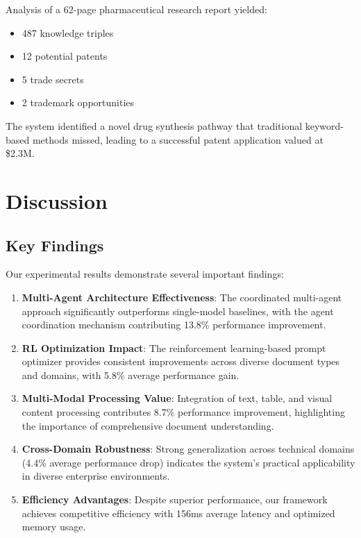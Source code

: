 \documentclass[11pt,a4paper]{article}
\begin{document}
Analysis of a 62-page pharmaceutical research report yielded:
\begin{itemize}
  \item 487 knowledge triples
  \item 12 potential patents
  \item 5 trade secrets
  \item 2 trademark opportunities
\end{itemize}

The system identified a novel drug synthesis pathway that traditional keyword-based methods missed, leading to a successful patent application valued at \$2.3M.

\section{Discussion}

\subsection{Key Findings}

Our experimental results demonstrate several important findings:

\begin{enumerate}
  \item \textbf{Multi-Agent Architecture Effectiveness}: The coordinated multi-agent approach significantly outperforms single-model baselines, with the agent coordination mechanism contributing 13.8\% performance improvement.
  
  \item \textbf{RL Optimization Impact}: The reinforcement learning-based prompt optimizer provides consistent improvements across diverse document types and domains, with 5.8\% average performance gain.
  
  \item \textbf{Multi-Modal Processing Value}: Integration of text, table, and visual content processing contributes 8.7\% performance improvement, highlighting the importance of comprehensive document understanding.
  
  \item \textbf{Cross-Domain Robustness}: Strong generalization across technical domains (4.4\% average performance drop) indicates the system's practical applicability in diverse enterprise environments.
  
  \item \textbf{Efficiency Advantages}: Despite superior performance, our framework achieves competitive efficiency with 156ms average latency and optimized memory usage.
\end{enumerate}
\end{document}

